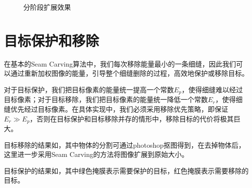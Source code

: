 \documentclass[11pt,a4paper]{article}
\begin{document}
\begin{figure}[H]
    \centering
    \caption{分阶段扩展效果}
    \label{fig:seg_expand}
\end{figure}

\section{目标保护和移除}

在基本的Seam Carving算法中，我们每次移除能量最小的一条细缝，因此我们可以通过重新加权图像的能量，引导整个细缝删除的过程，高效地保护或移除目标。

对于目标保护，我们把目标像素的能量统一提高一个常数$E_p$，使得细缝难以经过目标像素；对于目标移除，我们把目标像素的能量统一降低一个常数$E_r$，使得细缝优先经过目标像素。在具体实现中，我们必须采用移除优先策略，即保证$E_r \gg E_p$，否则在目标保护和目标移除并存的情形中，移除目标的代价将极其巨大。

目标移除的结果如，其中物体的分割可通过photoshop抠图得到，在去掉物体后，这里进一步采用Seam Carving的方法将图像扩展到原始大小。

目标保护的结果如，其中绿色掩膜表示需要保护的目标，红色掩膜表示需要移除的目标。
\end{document}
